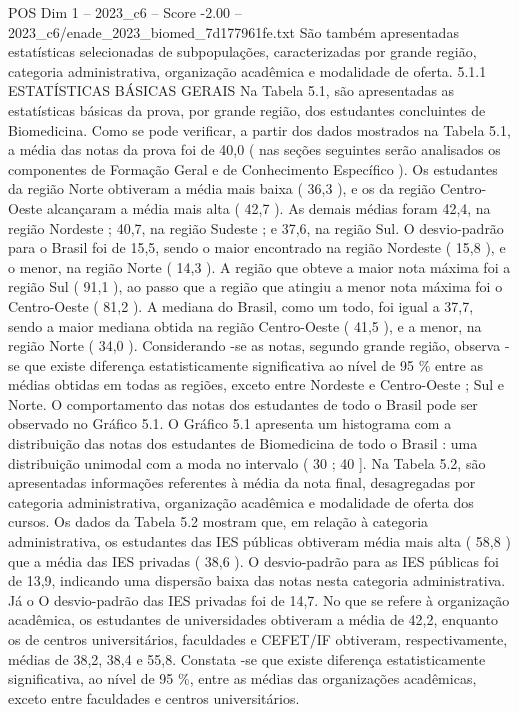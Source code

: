 \begin{textsample}{POS Dim 1 – 2023\_c6 – Score -2.00 – 2023\_c6/enade\_2023\_biomed\_7d177961fe.txt}
São também apresentadas estatísticas selecionadas de subpopulações, caracterizadas por grande região, categoria administrativa, organização acadêmica e modalidade de oferta. 5.1.1 ESTATÍSTICAS BÁSICAS GERAIS Na Tabela 5.1, são apresentadas as estatísticas básicas da prova, por grande região, dos estudantes concluintes de Biomedicina.
Como se pode verificar, a partir dos dados mostrados na Tabela 5.1, a média das notas da prova foi de 40,0 ( nas seções seguintes serão analisados os componentes de Formação Geral e de Conhecimento Específico ).
Os estudantes da região Norte obtiveram a média mais baixa ( 36,3 ), e os da região Centro-Oeste alcançaram a média mais alta ( 42,7 ).
As demais médias foram 42,4, na região Nordeste ; 40,7, na região Sudeste ; e 37,6, na região Sul.
O desvio-padrão para o Brasil foi de 15,5, sendo o maior encontrado na região Nordeste ( 15,8 ), e o menor, na região Norte ( 14,3 ).
A região que obteve a maior nota máxima foi a região Sul ( 91,1 ), ao passo que a região que atingiu a menor nota máxima foi o Centro-Oeste ( 81,2 ).
A mediana do Brasil, como um todo, foi igual a 37,7, sendo a maior mediana obtida na região Centro-Oeste ( 41,5 ), e a menor, na região Norte ( 34,0 ).
Considerando -se as notas, segundo grande região, observa -se que existe diferença estatisticamente significativa ao nível de 95 \% entre as médias obtidas em todas as regiões, exceto entre Nordeste e Centro-Oeste ; Sul e Norte.
O comportamento das notas dos estudantes de todo o Brasil pode ser observado no Gráfico 5.1.
O Gráfico 5.1 apresenta um histograma com a distribuição das notas dos estudantes de Biomedicina de todo o Brasil : uma distribuição unimodal com a moda no intervalo ( 30 ; 40 ].
Na Tabela 5.2, são apresentadas informações referentes à média da nota final, desagregadas por categoria administrativa, organização acadêmica e modalidade de oferta dos cursos.
Os dados da Tabela 5.2 mostram que, em relação à categoria administrativa, os estudantes das IES públicas obtiveram média mais alta ( 58,8 ) que a média das IES privadas ( 38,6 ).
O desvio-padrão para as IES públicas foi de 13,9, indicando uma dispersão baixa das notas nesta categoria administrativa.
Já o O desvio-padrão das IES privadas foi de 14,7.
No que se refere à organização acadêmica, os estudantes de universidades obtiveram a média de 42,2, enquanto os de centros universitários, faculdades e CEFET/IF obtiveram, respectivamente, médias de 38,2, 38,4 e 55,8.
Constata -se que existe diferença estatisticamente significativa, ao nível de 95 \%, entre as médias das organizações acadêmicas, exceto entre faculdades e centros universitários.

\end{textsample}
